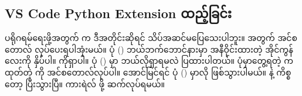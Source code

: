 \subsection*{VS Code Python Extension ထည့်ခြင်း}
 ပရိုဂရမ်ရေးဖို့အတွက်  က ဒီအတိုင်းဆိုရင် သိပ်အဆင်မပြေသေးပါဘူး။  အတွက်  အင်စတောလ် လုပ်ပေးရပါအုံးမယ်။ ပုံ (\fRefNo{\ref{fig:vswlcm}}) ဘယ်ဘက်ဘောင်နားမှာ အနီဝိုင်းထားတဲ့ အိုင်ကွန်လေးကို နှိပ်ပါ။   ကိုရှာပါ။   ပုံ (\fRefNo{\ref{fig:vspyplugin1}}) မှာ ဘယ်လိုရှာရမလဲ ပြထားပါတယ်။ ပုံမှာတွေ့ရတဲ့  က ထုတ်တဲ့  ကို အင်စတောလ်လုပ်ပါ။ အောင်မြင်ရင် ပုံ (\fRefNo{\ref{fig:vspyplugin2}}) မှာလို ဖြစ်သွားပါမယ်။  နဲ့   ကိစ္စတော့ ပြီးသွားပြီ။ ကားရဲလ်   ဖို့ ဆက်လုပ်ရမယ်။
\begin{figure}[tbh!]
\caption{} 
\label{fig:vspyplugin1}
\end{figure}

\begin{figure}[tbh!]
\caption{} 
\label{fig:vspyplugin2}
\end{figure}

